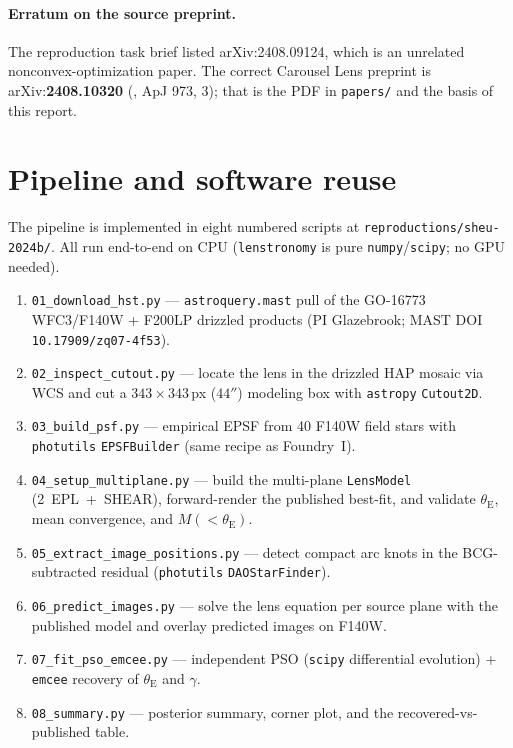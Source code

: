 \documentclass[11pt,letterpaper]{article}
\newcommand{\thetaE}{\ensuremath{\theta_{\mathrm{E}}}}
\newcommand{\gammaslope}{\ensuremath{\gamma}}
\begin{document}
\paragraph{Erratum on the source preprint.} The reproduction task brief listed
arXiv:2408.09124, which is an unrelated nonconvex-optimization paper. The
correct Carousel Lens preprint is arXiv:\textbf{2408.10320}
(\citealt{sheu2024carousel}, ApJ 973, 3); that is the PDF in
\texttt{papers/} and the basis of this report.

\section{Pipeline and software reuse}

The pipeline is implemented in eight numbered scripts at
\texttt{reproductions/sheu-2024b/}. All run end-to-end on CPU
(\texttt{lenstronomy} is pure \texttt{numpy}/\texttt{scipy}; no GPU needed).

\begin{enumerate}
\item \texttt{01\_download\_hst.py} --- \texttt{astroquery.mast}
      \autocite{astroquery2019} pull of the GO-16773 WFC3/F140W + F200LP
      drizzled products (PI Glazebrook; MAST DOI \texttt{10.17909/zq07-4f53}).
\item \texttt{02\_inspect\_cutout.py} --- locate the lens in the drizzled HAP
      mosaic via WCS and cut a $343\times343$\,px ($44''$) modeling box with
      \texttt{astropy} \autocite{astropy2022} \texttt{Cutout2D}.
\item \texttt{03\_build\_psf.py} --- empirical EPSF from 40 F140W field stars
      with \texttt{photutils} \texttt{EPSFBuilder}
      \autocite{bradley2024photutils} (same recipe as Foundry~I).
\item \texttt{04\_setup\_multiplane.py} --- build the multi-plane
      \texttt{LensModel} (2~EPL~+~SHEAR), forward-render the published
      best-fit, and validate $\thetaE$, mean convergence, and $M(<\thetaE)$.
\item \texttt{05\_extract\_image\_positions.py} --- detect compact arc knots in
      the BCG-subtracted residual (\texttt{photutils} \texttt{DAOStarFinder}).
\item \texttt{06\_predict\_images.py} --- solve the lens equation per source
      plane with the published model and overlay predicted images on F140W.
\item \texttt{07\_fit\_pso\_emcee.py} --- independent PSO (\texttt{scipy}
      differential evolution) + \texttt{emcee} recovery of $\thetaE$ and
      $\gammaslope$.
\item \texttt{08\_summary.py} --- posterior summary, corner plot, and the
      recovered-vs-published table.
\end{enumerate}
\end{document}
